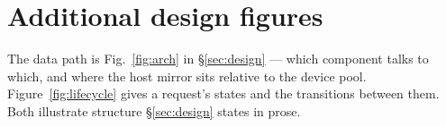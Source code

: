 
\section{Additional design figures}
\label{app:figures}

The data path is Fig.~\ref{fig:arch} in \S\ref{sec:design} --- which component talks to which,
and where the host mirror sits relative to the device pool.
Figure~\ref{fig:lifecycle} gives a request's states and the transitions between
them. Both illustrate structure \S\ref{sec:design} states in prose.



